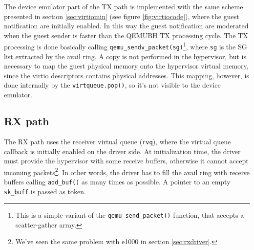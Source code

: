 \vspace{0.5cm}

The device emulator part of the TX path is implemented with the same scheme presented in section \ref{sec:virtiomin} (see figure
\ref{fig:virtiocode}), where the guest notification are initially enabled.
In this way the guest notification are moderated when the guest sender is faster than the QEMUBH TX processing cycle.
The TX processing is done basically calling \texttt{qemu\_sendv\_packet(sg)}\footnote{This is a simple variant of the
\texttt{qemu\_send\_packet()} function, that accepts a scatter-gather array.}, where \texttt{sg} is the SG list extracted by the avail ring.
A copy is not performed in the hypervisor, but is necessary to map the guest physical memory onto the hypervisor virtual memory, since the
virtio descriptors contains physical addresses. This mapping, however, is done internally by the \texttt{virtqueue.pop()}, so it's not
visible to the device emulator.


\subsection{RX path}
The RX path uses the receiver virtual queue (\texttt{rvq}), where the virtual queue callback is initially enabled on the driver side.
At initialization time, the driver must provide the hypervisor with some receive buffers, otherwise it cannot accept incoming
packets\footnote{We've seen the same problem with e1000 in section \ref{sec:rxdriver}.}. In other words, the driver has to fill the avail
ring with receive buffers calling \texttt{add\_buf()} as many times as possible. A pointer to an empty \texttt{sk\_buff} is passed as
token.

\vspace{0.5cm}

